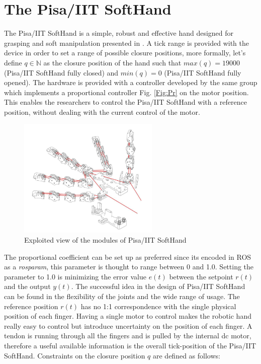\section{The Pisa/IIT SoftHand}\label{sec:softhand}
The Pisa/IIT SoftHand is a simple, robust and effective hand designed for grasping and soft manipulation presented in \cite{catalanopisa}. A tick range is provided with the device in order to set a range of possible closure positions, more formally, let's define $q \in \mathbb{N}$ as the closure position of the hand such that $max(q) = 19000$ (Pisa/IIT SoftHand fully closed) and $min(q)=0$ (Pisa/IIT SoftHand fully opened). The hardware is provided with a controller developed by the same group which implements a proportional controller Fig. \ref{Fig:Pr} on the motor position. This enables the researchers to control the Pisa/IIT SoftHand with a reference position, without dealing with the current control of the motor. \\
\begin{figure}[h]
\centering
\includegraphics[width=0.6\textwidth]{Figure/softhand.png}
\caption{Exploited view of the modules of Pisa/IIT SoftHand}
\label{Fig:Softhand}
\end{figure}
The proportional coefficient can be set up as preferred since its encoded in ROS as a \textit{rosparam}, this parameter is thought to range between 0 and 1.0. Setting the parameter to 1.0 is minimizing the error value $e(t)$  between the setpoint $r(t)$ and the output $y(t)$.
The successful idea in the design of Pisa/IIT SoftHand can be found in the flexibility of the joints and the wide range of usage.
The reference position $r(t)$ has no 1:1 correspondence with the single physical position of each finger. Having a single motor to control makes the robotic hand really easy to control but introduce uncertainty on the position of each finger. 
A tendon is running through all the fingers and is pulled by the internal dc motor, therefore a useful available information is the overall tick-position of the Pisa/IIT SoftHand. Constraints on the closure position $q$ are defined as follows:

